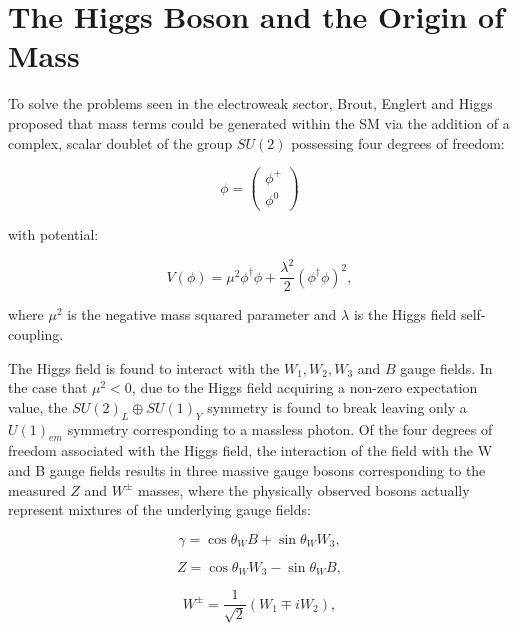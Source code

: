 \section{The Higgs Boson and the Origin of Mass}

To solve the problems seen in the electroweak sector, Brout, Englert and Higgs \cite{PhysRevLett.13.508}\cite{PhysRevLett.13.321} proposed that mass terms could be generated within the \ac{SM} via the addition of a complex, scalar doublet of the group $SU(2)$ possessing four degrees of freedom:

\begin{equation}
\phi = \begin{pmatrix} \phi^{+} \\ \phi^{0} \end{pmatrix} 
\end{equation}

with potential:

\begin{equation}
V(\phi) = \mu^{2}\phi^{\dagger}\phi + \frac{\lambda^{2}}{2}(\phi^{\dagger}\phi)^{2},
\end{equation}

where $\mu^{2}$ is the negative mass squared parameter and $\lambda$ is the Higgs field self-coupling.

The Higgs field is found to interact with the $W_{1},W_{2},W_{3}$ and $B$ gauge fields. In the case that $\mu^{2}<0$, due to the Higgs field acquiring a non-zero expectation value, the $SU(2)_{L}\oplus SU(1)_{Y}$ symmetry is found to break leaving only a $U(1)_{em}$ symmetry corresponding to a massless photon. Of the four degrees of freedom associated with the Higgs field, the interaction of the field with the W and B gauge fields results in three massive gauge bosons corresponding to the measured $Z$ and $W^{\pm}$ masses, where the physically observed bosons actually represent mixtures of the underlying gauge fields:

\begin{equation}
\gamma = \cos\theta_{W}B  +\sin\theta_{W}W_{3}, 
\end{equation}

\begin{equation}
Z = \cos\theta_{W}W_{3}  -\sin\theta_{W}B,
\end{equation}

\begin{equation}
W^{\pm}= \frac{1}{\sqrt{2}}(W_{1}\mp iW_{2}),
\end{equation}

